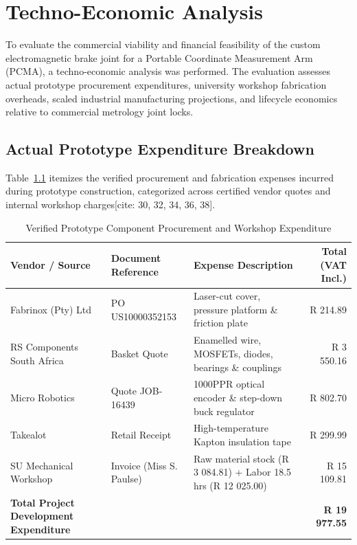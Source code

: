 \chapter{Techno-Economic Analysis}
\label{ch:techno_economic}

To evaluate the commercial viability and financial feasibility of the custom electromagnetic brake joint for a Portable Coordinate Measurement Arm (PCMA), a techno-economic analysis was performed. The evaluation assesses actual prototype procurement expenditures, university workshop fabrication overheads, scaled industrial manufacturing projections, and lifecycle economics relative to commercial metrology joint locks.

\section{Actual Prototype Expenditure Breakdown}
Table~\ref{tab:actual_project_expenses} itemizes the verified procurement and fabrication expenses incurred during prototype construction, categorized across certified vendor quotes and internal workshop charges[cite: 30, 32, 34, 36, 38].

\begin{table}[H]
	\centering
	\caption{Verified Prototype Component Procurement and Workshop Expenditure}
	\label{tab:actual_project_expenses}
	\small
	\begin{tabular}{lllr}
		\toprule
		\textbf{Vendor / Source} & \textbf{Document Reference} & \textbf{Expense Description} & \textbf{Total (VAT Incl.)} \\
		\midrule
		Fabrinox (Pty) Ltd    & PO US10000352153 & Laser-cut cover, pressure platform \& friction plate & R 214.89 \\
		RS Components South Africa & Basket Quote & Enamelled wire, MOSFETs, diodes, bearings \& couplings & R 3 550.16 \\
		Micro Robotics        & Quote JOB-16439 & 1000PPR optical encoder \& step-down buck regulator & R 802.70 \\
		Takealot              & Retail Receipt & High-temperature Kapton insulation tape & R 299.99 \\
		SU Mechanical Workshop& Invoice (Miss S. Paulse) & Raw material stock (R 3 084.81) + Labor 18.5 hrs (R 12 025.00) & R 15 109.81 \\
		\midrule
		\textbf{Total Project Development Expenditure} & & & \textbf{R 19 977.55} \\
		\bottomrule
	\end{tabular}
\end{table}

